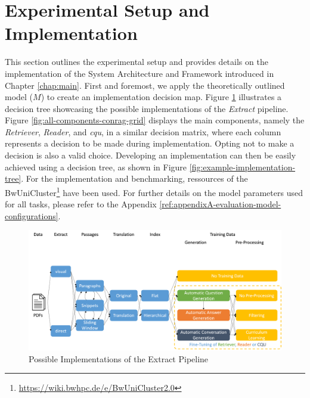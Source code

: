 
\section{Experimental Setup and Implementation}
\label{sec:setup}

This section outlines the experimental setup and provides details on the implementation of the System Architecture and Framework introduced in Chapter \ref{chap:main}. First and foremost, we apply the theoretically outlined model ($M$) to create an implementation decision map. Figure \ref{fig:extract-pipeline-implementation-grid} illustrates a decision tree showcasing the possible implementations of the \textit{Extract} pipeline. Figure \ref{fig:all-components-conrag-grid} displays the main components, namely the \textit{Retriever}, \textit{Reader}, and \textit{\gls{cqu}}, in a similar decision matrix, where each column represents a decision to be made during implementation. Opting not to make a decision is also a valid choice. Developing an implementation can then be easily achieved using a decision tree, as shown in Figure \ref{fig:example-implementation-tree}. For the implementation and benchmarking, ressources of the BwUniCluster\footnote{\url{https://wiki.bwhpc.de/e/BwUniCluster2.0}} have been used. For further details on the model parameters used for all tasks, please refer to the Appendix \ref{ref:appendixA-evaluation-model-configurations}.

\begin{figure}
    \centering
    \includegraphics[width=\textwidth]{Grafiken/extract_pipeline.png}
    \caption{Possible Implementations of the Extract Pipeline}
    \label{fig:extract-pipeline-implementation-grid}
\end{figure}

